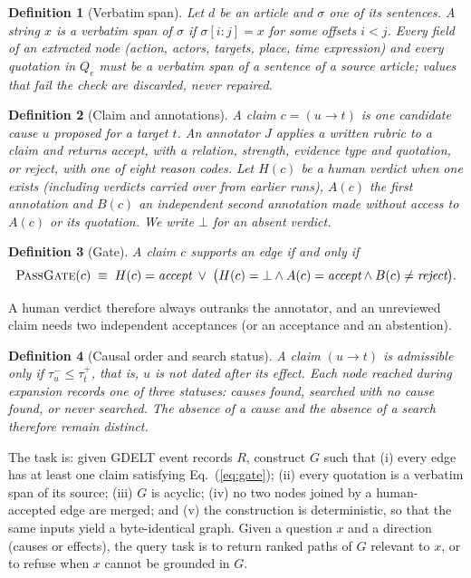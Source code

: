\documentclass[pdflatex,sn-basic,lineno]{sn-jnl}
\theoremstyle{thmstylethree}
\newtheorem{definition}{Definition}
\theoremstyle{thmstyleone}
\begin{document}
\begin{definition}[Verbatim span]
Let $d$ be an article and $\sigma$ one of its sentences. A string $x$ is a verbatim span of
$\sigma$ if $\sigma[i{:}j]=x$ for some offsets $i<j$. Every field of an extracted node (action,
actors, targets, place, time expression) and every quotation in $Q_e$ must be a verbatim span of
a sentence of a source article; values that fail the check are discarded, never repaired.
\end{definition}

\begin{definition}[Claim and annotations]
A \emph{claim} $c=(u\rightarrow t)$ is one candidate cause $u$ proposed for a target $t$. An
annotator $J$ applies a written rubric to a claim and returns \textit{accept}, with a relation,
strength, evidence type and quotation, or \textit{reject}, with one of eight reason codes. Let
$H(c)$ be a human verdict when one exists (including verdicts carried over from earlier runs),
$A(c)$ the first annotation and $B(c)$ an independent second annotation made without access to
$A(c)$ or its quotation. We write $\bot$ for an absent verdict.
\end{definition}

\begin{definition}[Gate]
A claim $c$ supports an edge if and only if
\begin{equation}
\textsc{PassGate}(c) \;\equiv\; H(c)=\textit{accept} \;\lor\; \bigl(H(c)=\bot \land
A(c)=\textit{accept} \land B(c)\neq\textit{reject}\bigr).
\label{eq:gate}
\end{equation}
\end{definition}

A human verdict therefore always outranks the annotator, and an unreviewed claim needs two
independent acceptances (or an acceptance and an abstention).

\begin{definition}[Causal order and search status]
A claim $(u\rightarrow t)$ is admissible only if $\tau^-_u\le\tau^+_t$, that is, $u$ is not dated
after its effect. Each node reached during expansion records one of three statuses: causes found,
searched with no cause found, or never searched. The absence of a cause and the absence of a search
therefore remain distinct.
\end{definition}

The task is: given GDELT event records $R$, construct $G$ such that (i) every edge has at least one
claim satisfying Eq.~(\ref{eq:gate}); (ii) every quotation is a verbatim span of its source;
(iii) $G$ is acyclic; (iv) no two nodes joined by a human-accepted edge are merged; and (v) the
construction is deterministic, so that the same inputs yield a byte-identical graph. Given a
question $x$ and a direction (causes or effects), the query task is to return ranked paths of $G$
relevant to $x$, or to refuse when $x$ cannot be grounded in $G$.
\end{document}
